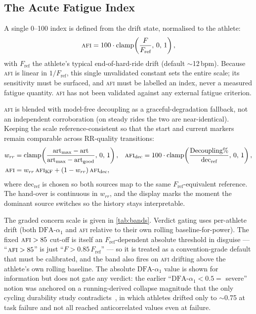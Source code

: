 \documentclass[11pt]{article}
\newcommand{\afi}{\textup{\textsc{afi}}}
\newcommand{\aone}{\ensuremath{\text{DFA-}\alpha_1}}
\newcommand{\Fstate}{\ensuremath{F}}
\begin{document}
\subsection{The Acute Fatigue Index}\label{sec:afi}
A single 0--100 index is defined from the drift state, normalised to the athlete:
\begin{equation}
\afi = 100\cdot\mathrm{clamp}\!\left(\frac{\Fstate}{F_{\text{ref}}},\,0,\,1\right),
\label{eq:afi}
\end{equation}
with $F_{\text{ref}}$ the athlete's typical end-of-hard-ride drift (default $\sim$12\,bpm). Because \afi{} is linear in $1/F_{\text{ref}}$, this single unvalidated constant sets the entire scale; its sensitivity must be surfaced, and \afi{} must be labelled an index, never a measured fatigue quantity. \afi{} has not been validated against any external fatigue criterion.

\afi{} is blended with model-free decoupling as a graceful-degradation fallback, not an independent corroboration (on steady rides the two are near-identical). Keeping the scale reference-consistent so that the start and current markers remain comparable across RR-quality transitions:
\begin{align}
w_{rr} &= \mathrm{clamp}\!\left(\frac{\text{art}_{\max}-\text{art}}{\text{art}_{\max}-\text{art}_{\text{good}}},\,0,\,1\right), &
\afi_{\text{dec}} &= 100\cdot\mathrm{clamp}\!\left(\frac{\text{Decoupling}\%}{\text{dec}_{\text{ref}}},\,0,\,1\right),\\
\afi &= w_{rr}\,\afi_{\text{KF}} + (1-w_{rr})\,\afi_{\text{dec}},
\label{eq:blend}
\end{align}
where $\text{dec}_{\text{ref}}$ is chosen so both sources map to the same $F_{\text{ref}}$-equivalent reference. The hand-over is continuous in $w_{rr}$, and the display marks the moment the dominant source switches so the history stays interpretable.

The graded concern scale is given in \autoref{tab:bands}. Verdict gating uses per-athlete drift (both $\aone$ and \afi{} relative to their own rolling baseline-for-power). The fixed $\afi>85$ cut-off is itself an $F_{\text{ref}}$-dependent absolute threshold in disguise --- ``$\afi>85$'' is just ``$\Fstate>0.85\,F_{\text{ref}}$'' --- so it is treated as a convention-grade default that must be calibrated, and the band also fires on \afi{} drifting above the athlete's own rolling baseline. The absolute $\aone$ value is shown for information but does not gate any verdict: the earlier ``$\aone<0.5=$ severe'' notion was anchored on a running-derived collapse magnitude that the only cycling durability study contradicts~\cite{rogers2025}, in which athletes drifted only to $\sim$0.75 at task failure and not all reached anticorrelated values even at failure.
\end{document}
